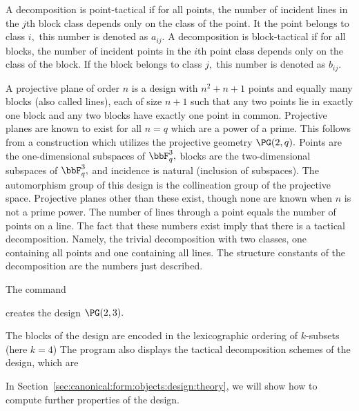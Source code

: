 \bigskip


A decomposition is point-tactical if for all points, 
the number of incident lines in the $j$th block class depends only on the class of the point.
It the point belongs to class $i,$ this number is denoted as $a_{ij}.$
A decomposition is block-tactical if for all blocks, 
the number of incident points in the $i$th point class depends only on the class of the block.
If the block belongs to class $j,$ this number is denoted as $b_{ij}.$

\bigskip

A projective plane of order $n$ is a 
design with $n^2+n+1$ points and equally many blocks (also called lines), each of size $n+1$ such that 
any two points lie in exactly one block and any two blocks have exactly one point in common.
Projective planes are known to exist for all $n = q$ which are a power of a prime. 
This follows from a construction which utilizes the projective geometry $\PG(2,q).$ 
Points are the one-dimensional subspaces of $\bbF_q^3,$
blocks are the two-dimensional subspaces of $\bbF_q^3,$ and
incidence is natural (inclusion of subspaces). 
The automorphism group of this design is the collineation group of the projective space.
Projective planes other than these exist, though none are known when $n$ is not a prime power.
The number of lines through a point equals the number of points on a line. 
The fact that these numbers exist imply that there is a tactical decomposition. 
Namely, the trivial decomposition with two classes, one containing all points and one containing all lines.
The structure constants of the decomposition are the numbers just described.

\bigskip

The command 
{\tt

}
creates the design $\PG(2,3).$ 
\begin{mdframed}[style=MyFrame]

\end{mdframed}
The blocks of the design are encoded in the lexicographic ordering of $k$-subsets (here $k=4$)
The program also displays the tactical decomposition schemes of the design, which are
\begin{mdframed}[style=MyFrame]

\end{mdframed}
In Section~\ref{sec:canonical:form:objects:design:theory}, we will show how to compute 
further properties of the design.


\bigskip

